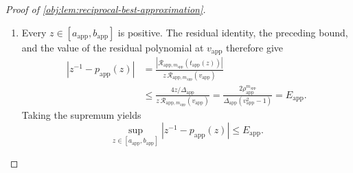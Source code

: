 \documentclass[11pt]{article}
\begin{document}
\begin{proof}[Proof of \cref{obj:lem:reciprocal-best-approximation}]
\begin{enumerate}
\[
t_{\mathrm{app}}(z)
=\frac{a_{\mathrm{app}}+b_{\mathrm{app}}-2z}
{\Delta_{\mathrm{app}}}
\in[-1,1].
\]
Choose \(\theta_{\mathrm{app}}\in[0,\pi]\) with
\(\cos\theta_{\mathrm{app}}=t_{\mathrm{app}}(z)\).
The nonnegative squares in the two identities imply
\[
-2(v_{\mathrm{app}}-t_{\mathrm{app}}(z))
\le
\mathcal R_{\mathrm{app},m_{\mathrm{app}}}(t_{\mathrm{app}}(z))
\le
2(v_{\mathrm{app}}-t_{\mathrm{app}}(z)).
\]
Hence
\[
\left|
\mathcal R_{\mathrm{app},m_{\mathrm{app}}}(t_{\mathrm{app}}(z))
\right|
\le
2(v_{\mathrm{app}}-t_{\mathrm{app}}(z))
=\frac{4z}{\Delta_{\mathrm{app}}}.
\]

\item Every \(z\in[a_{\mathrm{app}},b_{\mathrm{app}}]\) is positive. The residual identity, the preceding bound, and the value of the residual polynomial at \(v_{\mathrm{app}}\) therefore give
\[
\begin{aligned}
|z^{-1}-p_{\mathrm{app}}(z)|
&=
\frac{
|\mathcal R_{\mathrm{app},m_{\mathrm{app}}}(t_{\mathrm{app}}(z))|
}{
z\,\mathcal R_{\mathrm{app},m_{\mathrm{app}}}(v_{\mathrm{app}})
}\\
&\le
\frac{4z/\Delta_{\mathrm{app}}}
{z\,\mathcal R_{\mathrm{app},m_{\mathrm{app}}}(v_{\mathrm{app}})}
=
\frac{2\rho_{\mathrm{app}}^{m_{\mathrm{app}}}}
{\Delta_{\mathrm{app}}(v_{\mathrm{app}}^2-1)}
=E_{\mathrm{app}}.
\end{aligned}
\]
Taking the supremum yields
\[
\sup_{z\in[a_{\mathrm{app}},b_{\mathrm{app}}]}
|z^{-1}-p_{\mathrm{app}}(z)|
\le E_{\mathrm{app}}.
\]


\end{enumerate}
\end{proof}
\end{document}
